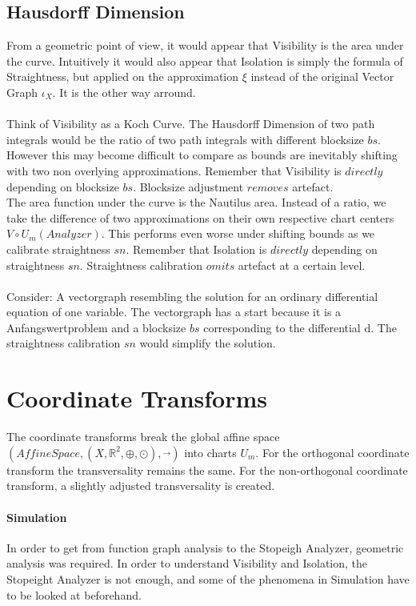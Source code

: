 \documentclass{report}
\begin{document}
\section{Hausdorff Dimension}

From a geometric point of view, it would appear that Visibility is the area under the curve. Intuitively it would also appear that Isolation is simply the formula of Straightness, but applied on the approximation $\xi$ instead of the original Vector Graph $\iota_{X}$. It is the other way arround.\\\\
Think of Visibility as a Koch Curve. The Hausdorff Dimension of two path integrals would be the ratio of two path integrals with different blocksize $bs$. However this may become difficult to compare as bounds are inevitably shifting with two non overlying approximations. Remember that Visibility is $directly$ depending on blocksize $bs$. Blocksize adjustment $removes$ artefact.\\
The area function under the curve is the Nautilus area. Instead of a ratio, we take the difference of two approximations on their own respective chart centers $V\circ U_{m}(Analyzer)$. This performs even worse under shifting bounds as we calibrate straightness $sn$. Remember that Isolation is $directly$ depending on straightness $sn$. Straightness calibration $omits$ artefact at a certain level.\\\\
Consider: A vectorgraph resembling the solution for an ordinary differential equation of one variable. The vectorgraph has a start because it is a Anfangswertproblem and a blocksize $bs$ corresponding to the differential $\mathrm{d}$. The straightness calibration $sn$ would simplify the solution.

\chapter{Coordinate Transforms}

The coordinate transforms break the global affine space $(AffineSpace,(X,\mathbb{R}^2,\oplus,\odot),\overrightarrow{\text{ }})$ into charts $U_{m}$. For the orthogonal coordinate transform the transversality remains the same. For the non-orthogonal coordinate transform, a slightly adjusted transversality is created.

\subsubsection*{Simulation}
In order to get from function graph analysis to the Stopeigh Analyzer, geometric analysis was required. In order to understand Visibility and Isolation, the Stopeight Analyzer is not enough, and some of the phenomena in Simulation have to be looked at beforehand.
\end{document}
